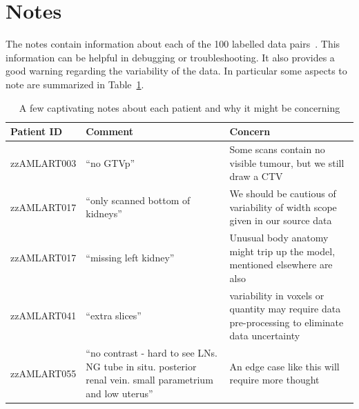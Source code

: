 \documentclass[11pt,twoside]{report}
\begin{document}
\section{Notes}\label{sec:data-notes}

The notes contain information about each of the 100 labelled data pairs~\cite{AMLART-data}. This information can be helpful in debugging or troubleshooting. It also provides a good warning regarding the variability of the data. In particular some aspects to note are summarized in Table~\ref{tab:notes-summary}.

\begin{table}[ht]
  \centering
  \begin{tabular}{>{\raggedright}p{3cm}p{6cm}p{6cm}}
    \toprule
    \textbf{Patient ID} & \textbf{Comment}                                                                                           & \textbf{Concern}                                                                                \\
    \midrule
    zzAMLART003         & ``no GTVp''                                                                                                & Some scans contain no visible tumour, but we still draw a CTV                                   \\
    \midrule
    zzAMLART017         & ``only scanned bottom of kidneys''                                                                         & We should be cautious of variability of width scope given in our source data                    \\
    \midrule
    zzAMLART017         & ``missing left kidney''                                                                                    & Unusual body anatomy might trip up the model, mentioned elsewhere are also                      \\
    \midrule
    zzAMLART041         & ``extra slices''                                                                                           & variability in voxels or quantity may require data pre-processing to eliminate data uncertainty \\
    \midrule
    zzAMLART055         & ``no contrast - hard to see LNs. NG tube in situ. posterior renal vein. small parametrium and low uterus'' & An edge case like this will require more thought                                                \\
    \bottomrule
  \end{tabular}
  \caption{A few captivating notes about each patient and why it might be concerning}
 \label{tab:notes-summary}
\end{table}
\end{document}

